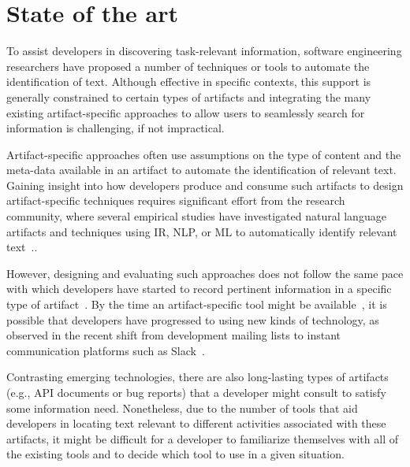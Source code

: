 \section{State of the art}
\label{cp1:novelty}



To assist developers in discovering task-relevant information,
software engineering researchers have proposed 
a number of techniques or tools 
to automate the identification of  text.
Although effective in specific contexts, this support is generally constrained 
to certain
types of artifacts and integrating the many existing artifact-specific
approaches to allow users to seamlessly search for information is challenging, if not impractical. 


Artifact-specific approaches often use assumptions on the type of content 
and the meta-data available in an artifact
to automate the identification of relevant text.
Gaining insight into how developers produce and consume 
such artifacts to design artifact-specific techniques
 requires significant effort from the research community,
 where several empirical studies have investigated 
natural language artifacts 
and techniques using \acf{IR}, \acf{NLP}, or \acf{ML}  to automatically identify
relevant text~\cite{panichella2012, Ko2006, Arya2019, Maalej2013}..


However, designing and evaluating such approaches
does not follow the same pace with which developers have started to 
record pertinent information in a specific type of artifact~\cite{garousi2019}.
By the time an artifact-specific tool might be available~\cite{gibbs1994},
it is possible 
that developers have progressed to using new kinds of technology,
as observed in the recent shift from 
development mailing lists to instant communication platforms such as Slack~\cite{Lin2016, Chatterjee2020}. 




Contrasting emerging technologies, 
there are also
long-lasting types of artifacts (e.g., API documents or bug reports) that a developer
might consult to satisfy some information need. 
Nonetheless, due to the number of tools that aid developers in locating text relevant to different activities associated with these artifacts, it might be difficult for a developer to familiarize themselves 
with all of the existing tools
and to decide which tool to use in a given situation.




